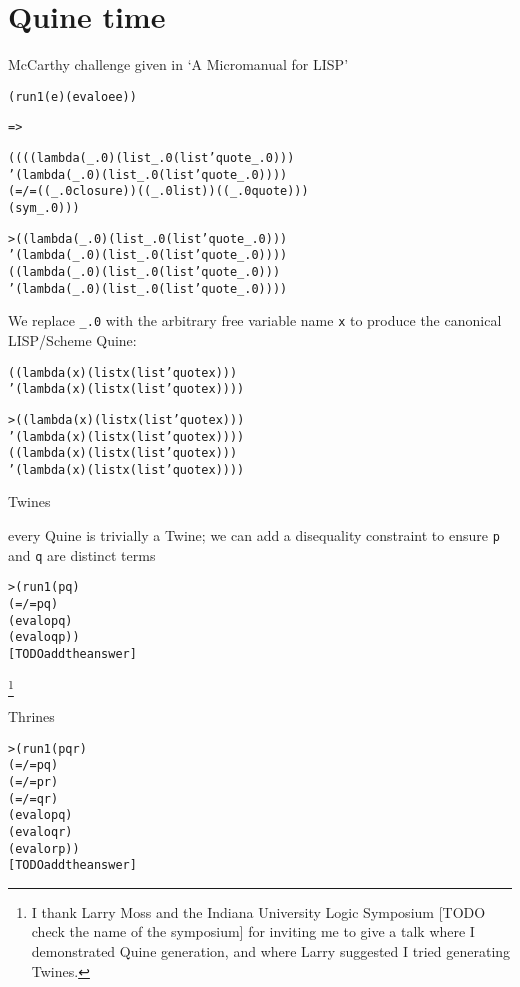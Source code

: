 \documentclass{book}
\begin{document}
\chapter{Quine time}%

McCarthy challenge given in `A Micromanual for LISP'

\begin{alltt}
(run 1 (e) (evalo e e))
\end{alltt}
\verb|=>|
\begin{alltt}
((((lambda (_.0) (list _.0 (list 'quote _.0)))
   '(lambda (_.0) (list _.0 (list 'quote _.0))))
  (=/= ((_.0 closure)) ((_.0 list)) ((_.0 quote)))
  (sym _.0)))
\end{alltt}

\begin{alltt}
> ((lambda (_.0) (list _.0 (list 'quote _.0)))
    '(lambda (_.0) (list _.0 (list 'quote _.0))))
((lambda (_.0) (list _.0 (list 'quote _.0)))
  '(lambda (_.0) (list _.0 (list 'quote _.0))))
\end{alltt}

We replace \verb|_.0| with the arbitrary free variable name \verb|x| to produce the canonical LISP/Scheme Quine:

\begin{alltt}
((lambda (x) (list x (list 'quote x)))
 '(lambda (x) (list x (list 'quote x))))
\end{alltt}

\begin{alltt}
> ((lambda (x) (list x (list 'quote x)))
   '(lambda (x) (list x (list 'quote x))))
((lambda (x) (list x (list 'quote x)))
  '(lambda (x) (list x (list 'quote x))))
\end{alltt}

Twines

every Quine is trivially a Twine; we can add a disequality constraint to ensure \verb|p| and \verb|q| are distinct terms

\begin{alltt}
> (run 1 (p q)
    (=/= p q)
    (evalo p q)
    (evalo q p))
[TODO add the answer]
\end{alltt}

\footnote{I thank Larry Moss and the Indiana University Logic Symposium [TODO check the name of the symposium] for inviting me to give a talk where I demonstrated Quine generation, and where Larry suggested I tried generating Twines.}

Thrines

\begin{alltt}
> (run 1 (p q r)
    (=/= p q)
    (=/= p r)
    (=/= q r)    
    (evalo p q)
    (evalo q r)
    (evalo r p))
[TODO add the answer]
\end{alltt}
\end{document}
